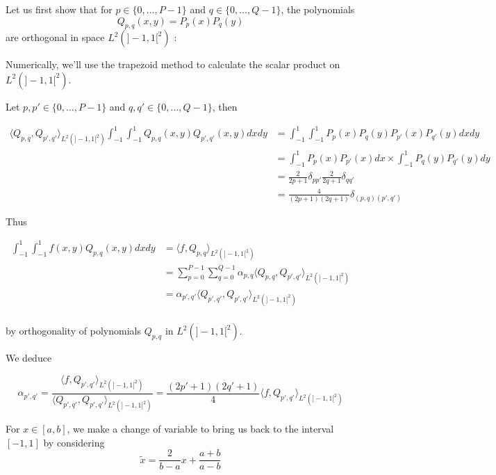 Let us first show that for $p\in\{0,\dots,P-1\}$ and $q\in\{0,\dots,Q-1\}$, the polynomials
\begin{equation*}
	Q_{p,q}(x,y)=P_p(x)P_q(y)
\end{equation*}
are orthogonal in space $L^2(]-1,1[^2)$ :

\begin{Rem}
	Numerically, we'll use the trapezoid method to calculate the scalar product on $L^2(]-1,1[^2)$.
\end{Rem}

Let $p,p'\in\{0,\dots,P-1\}$ and $q,q'\in\{0,\dots,Q-1\}$, then

\begin{align*}
	\langle Q_{p,q},Q_{p',q'}\rangle_{L^2(]-1,1[^2)}\int_{-1}^1 \int_{-1}^1 Q_{p,q}(x,y)Q_{p',q'}(x,y)dxdy&=\int_{-1}^1 \int_{-1}^1 P_p(x)P_q(y)P_{p'}(x)P_{q'}(y)dxdy \\
	&=\int_{-1}^1 P_p(x)P_{p'}(x)dx\times \int_{-1}^1 P_q(y)P_{q'}(y)dy \\
	&=\frac{2}{2p+1}\delta_{pp'}\frac{2}{2q+1}\delta_{qq'} \\
	&=\frac{4}{(2p+1)(2q+1)}\delta_{(p,q)(p',q')}
\end{align*}

Thus

\begin{align*}
	\int_{-1}^1 \int_{-1}^1 f(x,y)Q_{p,q}(x,y)dxdy &= \langle f,Q_{p,q}\rangle_{L^2(]-1,1[^2)} \\
	&=\sum_{p=0}^{P-1}\sum_{q=0}^{Q-1}\alpha_{p,q} \langle Q_{p,q},Q_{p',q'}\rangle_{L^2(]-1,1[^2)} \\
	&=\alpha_{p',q'} \langle Q_{p',q'},Q_{p',q'}\rangle_{L^2(]-1,1[^2)} \\
\end{align*}

by orthogonality of polynomials $Q_{p,q}$ in  $L^2(]-1,1[^2)$. 

We deduce

$$\alpha_{p',q'} = \frac{\langle f,Q_{p',q'}\rangle_{L^2(]-1,1[^2)}}{\langle Q_{p',q'},Q_{p',q'}\rangle_{L^2(]-1,1[^2)}}=\frac{(2p'+1)(2q'+1)}{4}\langle f,Q_{p',q'}\rangle_{L^2(]-1,1[^2)}$$

\begin{Rem}
	For $x\in[a,b]$, we make a change of variable to bring us back to the interval $[-1,1]$ by considering
	\begin{equation*}
		\tilde{x}=\frac{2}{b-a}x+\frac{a+b}{a-b}
	\end{equation*}
\end{Rem}

